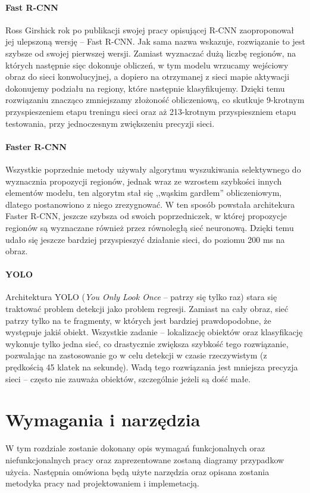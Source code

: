 \documentclass[a4paper,twoside,12pt]{book}
\newcommand{\obcy}[1]{\emph{#1}}
\newcommand{\ang}[1]{{\selectlanguage{british}\obcy{#1}}}
\begin{document}
{\subsubsection{Fast R-CNN\cite{girshick2015fast}}
{Ross Girshick rok po publikacji swojej pracy opisującej R-CNN zaoproponował jej ulepszoną wersję – Fast R-CNN. Jak sama nazwa wskazuje, rozwiązanie to jest szybsze od swojej pierwszej wersji. Zamiast wyznaczać dużą liczbę regionów, na których następnie sięc dokonuje obliczeń, w tym modelu wrzucamy wejściowy obraz do sieci konwolucyjnej, a dopiero na otrzymanej z sieci mapie aktywacji dokonujemy podziału na regiony, które następnie klasyfikujemy. Dzięki temu rozwiązaniu znacząco zmniejszamy złożoność obliczeniową, co skutkuje 9-krotnym przyspieszeniem etapu treningu sieci oraz aż 213-krotnym przyspieszniem etapu testowania, przy jednoczesnym zwiększeniu precyzji sieci.}
\subsubsection{Faster R-CNN\cite{ren2015faster}}
{Wszystkie poprzednie metody używały algorytmu wyszukiwania selektywnego do wyznacznia propozycji regionów, jednak wraz ze wzrostem szybkości innych elementów modelu, ten algorytm stał się ,,wąskim gardłem'' obliczeniowym, dlatego postanowiono z niego zrezygnować. W ten sposób powstała architekura Faster R-CNN, jeszcze szybsza od swoich poprzedniczek, w której propozycje regionów są wyznaczane również przez równoległą sieć neuronową. Dzięki temu udało się jeszcze bardziej przyspieszyć działanie sieci, do poziomu 200 ms na obraz.}
\subsubsection{YOLO\cite{redmon2016you}}
{Architektura YOLO (\ang{You Only Look Once} – patrzy się tylko raz) stara się traktować problem detekcji jako problem regresji. Zamiast na cały obraz, sieć patrzy tylko na te fragmenty, w których jest bardziej prawdopodobne, że występuje jakiś obiekt. Wszystkie zadanie – lokalizację obiektów oraz klasyfikację wykonuje tylko jedna sieć, co drastycznie zwiększa szybkość tego rozwiązanie, pozwalając na zastosowanie go w celu detekcji w czasie rzeczywistym (z prędkością 45 klatek na sekundę). Wadą tego rozwiązania jest mniejsza precyzja sieci – często nie zauważa obiektów, szczególnie jeżeli są dość małe.}


 
\chapter{Wymagania i narzędzia}
{W tym rozdziale zostanie dokonany opis wymagań funkcjonalnych oraz niefunkcjonalnych pracy oraz zaprezentowane zostaną diagramy przypadkow użycia. Następnia omówiona będą użyte narzędzia oraz opisana zostania metodyka pracy nad projektowaniem i implemetacją.}
}
\end{document}
